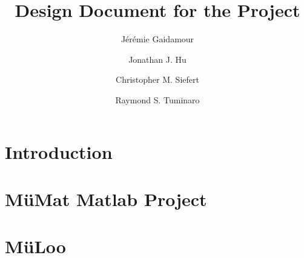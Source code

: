 \documentclass[pdf,ps2pdf,12pt,report]{article}
\title{Design Document for the \mloo Project}
\author[1]{J\'er\'emie Gaidamour}
\author[1]{Jonathan J. Hu}
\author[2]{Christopher M. Siefert}
\author[1]{Raymond S. Tuminaro}
\affil[1]{Scalable Algorithms Department}
\affil[2]{Computational Shock \& Multiphysics Department}
\newcommand{\ML}{{\sc ML}\xspace}
\newcommand{\mloo}{{\sc \textsf{M\"{u}Loo}}\xspace}
\newcommand{\muelu}{\mloo}
\newcommand{\muemat}{{\sc\textsf{M\"{u}Mat}}\xspace}
\newcommand{\SectionMueMat}[1]{#1}
\newcommand{\SectionMueLu}[1]{#1}
\newcommand{\SectionMueLuAPI}[1]{}
\begin{document}
  \maketitle

  \tableofcontents

  \section{Introduction}
  
  \SectionMueMat{
    \section{\muemat Matlab Project}\label{muemat}
    
  }
  \SectionMueLu{
    \section{\muelu}\label{muelu}
    
  }
  \SectionMueLuAPI{
    \section{\mloo API}\label{api}
    
}

%  
\end{document}
